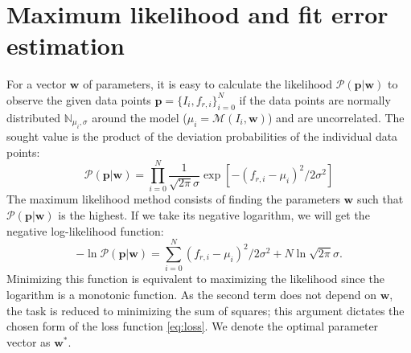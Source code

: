 \documentclass[%
 aip,
 draft,
 amsmath,amssymb,
 reprint,%
]{revtex4-1}
\begin{document}
\section{Maximum likelihood and fit error estimation}\label{sec:ML}
	
For a vector $\mathbf{w}$ of parameters, it is easy to calculate the likelihood $ \mathcal{P}(\mathbf{p}|\mathbf{w}) $ to observe the given data points $\mathbf{p} = \{I_i, f_{r,i}\}_{i=0}^N$ if the data points are normally distributed $\mathbb{N}_{\mu_i, \sigma}$ around the model ($\mu_i = \mathcal{M}(I_i, \mathbf{w})$) and are uncorrelated. The sought value is the product of the deviation probabilities of the individual data points:
\begin{equation}
\mathcal{P}(\mathbf{p}|\mathbf{w}) = \prod_{i=0}^{N} \frac{1}{\sqrt{2\pi}\sigma} \exp[ -(f_{r,i} - \mu_i)^2 / 2 \sigma^2]\label{eq:MLE} 
\end{equation}
The maximum likelihood method consists of finding the parameters $\mathbf{w}$ such that $ \mathcal{P}(\mathbf{p}|\mathbf{w}) $ is the highest. If we take its negative logarithm, we will get the negative log-likelihood function:
\begin{equation}
- \ln \mathcal{P}(\mathbf{p}|\mathbf{w}) = \sum_{i=0}^N (f_{r,i} - \mu_i)^2 / 2 \sigma^2 + N \ln\sqrt{2\pi}\sigma.
\label{eq:logL}
\end{equation}
Minimizing this function is equivalent to maximizing the likelihood since the logarithm is a monotonic function. As the second term does not depend on $\mathbf{w}$, the task is reduced to minimizing the sum of squares; this argument dictates the chosen form of the loss function \eqref{eq:loss}. We denote the optimal parameter vector as $\mathbf{w}^*$.
\end{document}
